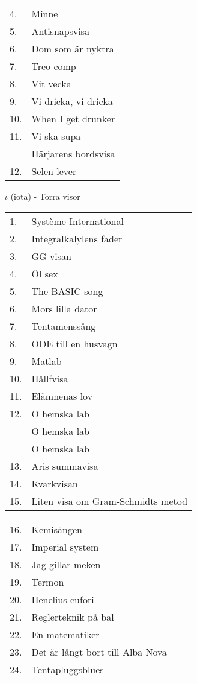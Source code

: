 \documentclass[a6paper,10pt]{article}
\begin{document}
\begin{table}[!h]
\begin{tabularx}{1\textwidth}{l X}
4.&Minne\\
5.&Antisnapsvisa\\
6.&Dom som är nyktra\\
7.&Treo-comp\\
8.&Vit vecka\\
9.&Vi dricka, vi dricka\\
10.&When I get drunker\\
11.&Vi ska supa\\
&Härjarens bordsvisa\\
12.&Selen lever
\end{tabularx}
\end{table}
\vspace{-5pt}
\noindent
\Large $\iota$ (iota) - Torra visor
\vspace{-5pt}
\begin{table}[!h]
\begin{tabularx}{1\textwidth}{l X}
1.&Système International\\
2.&Integralkalylens fader\\
3.&GG-visan\\
4.&Öl sex\\
5.&The BASIC song\\
6.&Mors lilla dator\\
7.&Tentamenssång\\
8.&ODE till en husvagn\\
9.&Matlab\\
10.&Hållfvisa\\
11.&Elämnenas lov\\
12.&O hemska lab\\
&O hemska lab\\
&O hemska lab\\
13.&Aris summavisa\\
14.&Kvarkvisan\\
15.&Liten visa om Gram-Schmidts metod\\
\end{tabularx}
\end{table}
\begin{table}[!h]
\begin{tabularx}{1\textwidth}{l X}
16.&Kemisången\\
17.&Imperial system\\
18.&Jag gillar meken\\
19.&Termon\\
20.&Henelius-eufori\\
21.&Reglerteknik på bal\\
22.&En matematiker\\
23.&Det är långt bort till Alba Nova\\
24.&Tentapluggsblues
\end{tabularx}
\end{table}
\end{document}
